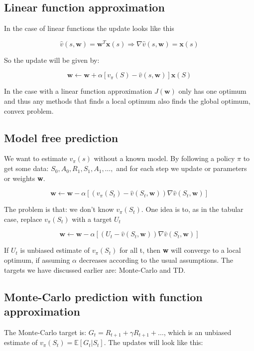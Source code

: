 \subsection*{Linear function approximation}
In the case of linear functions the update looks like this

	\begin{equation}
		\hat{v}(s,\textbf{w}) = \textbf{w}^{T}\textbf{x}(s) \Rightarrow \nabla \hat{v}(s, \textbf{w}) = \textbf{x}(s)
	\end{equation}

So the update will be given by:

	\begin{equation}
		\textbf{w} \leftarrow \textbf{w} + \alpha [v_\pi(S) - \hat{v}(s,\textbf{w})]\textbf{x}(S)
	\end{equation}

In the case with a linear function approximation $J(\textbf{w})$ only has one optimum and thus any methods that finds a local optimum also finds the global optimum, convex problem. 

\subsection*{Model free prediction}
We want to estimate $v_\pi(s)$ without a known model. By following a policy $\pi$ to get some data: $S_0,A_0,R_1,S_1,A_1,\ldots,$ and for each step we update or parameters or weights \textbf{w}. 

	\begin{equation}
		\textbf{w} \leftarrow \textbf{w} - \alpha [(v_\pi(S_t) - \hat{v}(S_t, \textbf{w}))\nabla \hat{v}(S_t,\textbf{w})]
	\end{equation}

The problem is that: we don't know $v_\pi(S_t)$. One idea is to, as in the tabular case, replace $v_\pi(S_t)$ with a target $U_t$

	\begin{equation}
		\textbf{w} \leftarrow \textbf{w} - \alpha [(U_t - \hat{v}(S_t, \textbf{w}))\nabla \hat{v}(S_t,\textbf{w})]
	\end{equation}

If $U_t$ is unbiased estimate of $v_\pi(S_t)$ for all t, then \textbf{w} will converge to a local optimum, if assuming $\alpha$ decreases according to the usual assumptions. The targets we have discussed earlier are: Monte-Carlo and TD.

\subsection*{Monte-Carlo prediction with function approximation}
The Monte-Carlo target is: $G_t = R_{t+1} + \gamma R_{t+1} + \ldots$, which is an unbiased estimate of $v_\pi(S_t) = \mathbb{E}[G_t | S_t]$. The updates will look like this:

